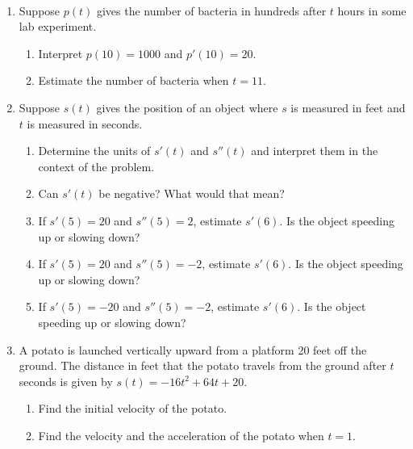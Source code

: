 \documentclass[11pt,fleqn]{article}
\begin{document}
\renewcommand{\headrulewidth}{0pt}
\newcommand{\blank}[1]{\rule{#1}{0.75pt}}
\newcommand{\bc}{\begin{center}}
\newcommand{\ec}{\end{center}}
\renewcommand{\d}{\displaystyle}

\vspace*{-0.7in}

\begin{center}
  \large
  \\
\end{center}
\begin{enumerate}
\item Suppose $p(t)$ gives the number of bacteria in hundreds after $t$ hours in some lab experiment. 
	\begin{enumerate}
	\item  Interpret $p(10)=1000$ and $p'(10)=20.$
	\vfill
	\item Estimate the number of bacteria when $t=11.$
	\vfill
	\end{enumerate}
\item Suppose $s(t)$ gives the position of an object where $s$ is measured in feet and $t$ is measured in seconds.\\
	\begin{enumerate}
	\item  Determine the units of $s'(t)$ and $s''(t)$ and interpret them in the context of the problem.
	\vfill
	\item Can $s'(t)$ be negative? What would that mean?
	\vfill
	\item If $s'(5)=20$ and $s''(5)=2$, estimate $s'(6).$ Is the object speeding up or slowing down?
	\vfill
	\item If $s'(5)=20$ and $s''(5)=-2$, estimate $s'(6).$ Is the object speeding up or slowing down?
	\vfill
	\item If $s'(5)=-20$ and $s''(5)=-2$, estimate $s'(6).$ Is the object speeding up or slowing down?
	\vfill
	\end{enumerate}
\newpage
\item A potato is launched vertically upward from a platform 20 feet off the ground. The distance in feet that the potato travels from the ground after $t$ seconds is given by $s(t)=-16t^2+64t+20.$
	\begin{enumerate}
	\item Find the initial velocity of the potato.
	\vfill
	\item Find the velocity and the acceleration of the potato when $t=1.$ 	\vfill

\end{enumerate}
\end{enumerate}
\end{document}
